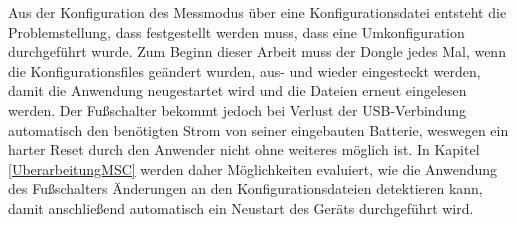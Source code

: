 Aus der Konfiguration des Messmodus über eine Konfigurationsdatei entsteht die Problemstellung, dass festgestellt werden muss, dass eine Umkonfiguration durchgeführt wurde. Zum Beginn dieser Arbeit muss der Dongle jedes Mal, wenn die Konfigurationsfiles geändert wurden, aus- und wieder eingesteckt werden, damit die Anwendung neugestartet wird und die Dateien erneut eingelesen werden. Der Fußschalter bekommt jedoch bei Verlust der \ac{USB}-Verbindung automatisch den benötigten Strom von seiner eingebauten Batterie, weswegen ein harter Reset durch den Anwender nicht ohne weiteres möglich ist. In Kapitel \ref{UberarbeitungMSC} werden daher Möglichkeiten evaluiert, wie die Anwendung des Fußschalters Änderungen an den Konfigurationsdateien detektieren kann, damit anschließend automatisch ein Neustart des Geräts durchgeführt wird.

